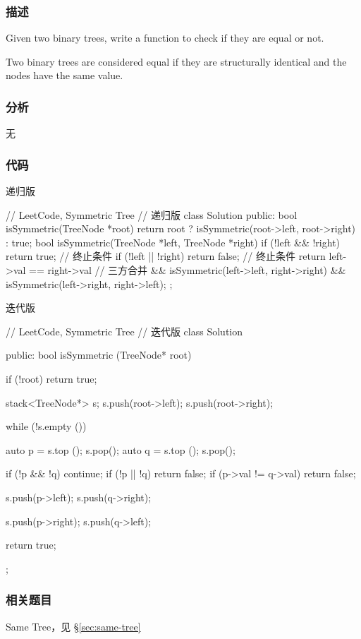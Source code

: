 \subsubsection{描述}
Given two binary trees, write a function to check if they are equal or not.

Two binary trees are considered equal if they are structurally identical and the nodes have the same value.


\subsubsection{分析}
无


\subsubsection{代码}
递归版
\begin{Code}
// LeetCode, Symmetric Tree
// 递归版
class Solution {
public:
    bool isSymmetric(TreeNode *root) {
        return root ? isSymmetric(root->left, root->right) : true;
    }
    bool isSymmetric(TreeNode *left, TreeNode *right) {
        if (!left && !right) return true;   // 终止条件
        if (!left || !right) return false;  // 终止条件
        return left->val == right->val      // 三方合并
                && isSymmetric(left->left, right->right)
                && isSymmetric(left->right, right->left);
    }
};
\end{Code}

迭代版
\begin{Code}
// LeetCode, Symmetric Tree
// 迭代版
class Solution {
public:
    bool isSymmetric (TreeNode* root) {
        if (!root) return true;

        stack<TreeNode*> s;
        s.push(root->left);
        s.push(root->right);

        while (!s.empty ()) {
            auto p = s.top (); s.pop();
            auto q = s.top (); s.pop();

            if (!p && !q) continue;
            if (!p || !q) return false;
            if (p->val != q->val) return false;

            s.push(p->left);
            s.push(q->right);

            s.push(p->right);
            s.push(q->left);
        }

        return true;
    }
};
\end{Code}


\subsubsection{相关题目}
\begindot
\item Same Tree，见 \S \ref{sec:same-tree}
\myenddot



